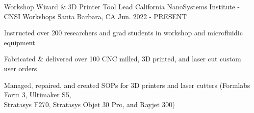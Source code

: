 \begin{cventries}
\cventry
{Workshop Wizard \& 3D Printer Tool Lead} %
{California NanoSystems Institute - CNSI Workshops} %
{Santa Barbara, CA} %
{Jun. 2022 - PRESENT} %
{ %
\begin{cvitems}
\item {Instructed over 200 researchers and grad students in workshop and microfluidic equipment}
\item {Fabricated \& delivered over 100 CNC milled, 3D printed, and laser cut custom user orders}
\item {Managed, repaired, and created SOPs for 3D printers and laser cutters  (Formlabs Form 3,  Ultimaker S5, \\ Stratasys F270, Stratasys Objet 30 Pro, and Rayjet 300)}
\end{cvitems}
}








\end{cventries}
